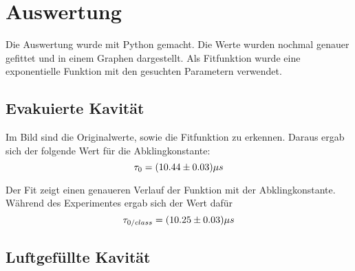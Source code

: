 \section{Auswertung}

Die Auswertung wurde mit Python gemacht. Die Werte wurden nochmal genauer gefittet und in einem Graphen dargestellt. Als Fitfunktion wurde eine exponentielle Funktion mit den gesuchten Parametern verwendet. 

\subsection{Evakuierte Kavität}


Im Bild sind die Originalwerte, sowie die Fitfunktion zu erkennen. Daraus ergab sich der folgende Wert für die Abklingkonstante:
\begin{equation}
\notag
\tau_{0}= (10.44 \pm 0.03)\mu s
\end{equation}

Der Fit zeigt einen genaueren Verlauf der Funktion mit der Abklingkonstante. Während des Experimentes ergab sich der Wert dafür 
\begin{equation}
\notag
\tau_{0/class}= (10.25 \pm 0.03)\mu s
\end{equation}

\subsection{Luftgefüllte Kavität}

